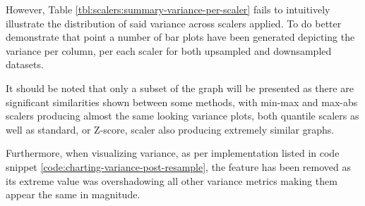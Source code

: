 However, Table \ref{tbl:scalers:summary-variance-per-scaler} fails to intuitively illustrate the distribution of said variance across scalers applied. To do better demonstrate that point a number of bar plots have been generated depicting the variance per column, per each scaler for both upsampled and downsampled datasets. 

It should be noted that only a subset of the graph will be presented as there are significant similarities shown between some methods, with min-max and max-abs scalers producing almost the same looking variance plots, both quantile scalers as well as standard, or Z-score, scaler also producing extremely similar graphs.

Furthermore, when visualizing variance, as per implementation listed in code snippet \ref{code:charting-variance-post-resample}, the \fileAgeInSec{} feature has been removed as its extreme value was overshadowing all other variance metrics making them appear the same in magnitude. 

